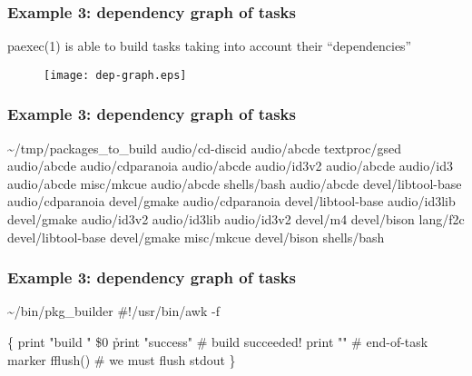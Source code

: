 \documentclass[hyperref={colorlinks=true}]{beamer}
\begin{document}
\begin{frame}[fragile]
  \frametitle{Example 3: dependency graph of tasks}
  paexec(1) is able to build tasks taking into account their ``dependencies''
  \begin{block}{}
    \begin{figure}
      \texttt{[image: dep-graph.eps]}
    \end{figure}
  \end{block}
\end{frame}

\begin{frame}[fragile]
  \frametitle{Example 3: dependency graph of tasks}

  \begin{block}{}
      \begin{CodeSmall}{\~{}/tmp/packages\_to\_build}
audio/cd-discid audio/abcde
textproc/gsed audio/abcde
audio/cdparanoia audio/abcde
audio/id3v2 audio/abcde
audio/id3 audio/abcde
misc/mkcue audio/abcde
shells/bash audio/abcde
devel/libtool-base audio/cdparanoia
devel/gmake audio/cdparanoia
devel/libtool-base audio/id3lib
devel/gmake audio/id3v2
audio/id3lib audio/id3v2
devel/m4 devel/bison
lang/f2c devel/libtool-base
devel/gmake misc/mkcue
devel/bison shells/bash
      \end{CodeSmall}
  \end{block}
\end{frame}

\begin{frame}[fragile]
  \frametitle{Example 3: dependency graph of tasks}

  \begin{block}{}
      \begin{CodeSmall}{\~{}/bin/pkg\_builder}
#!/usr/bin/awk -f

\{
   print "build " \$0
   \h{print "success"} # build succeeded!
   print ""        # end-of-task marker
   fflush()        # we must flush stdout
\}
      \end{CodeSmall}
  \end{block}
\end{frame}
\end{document}
